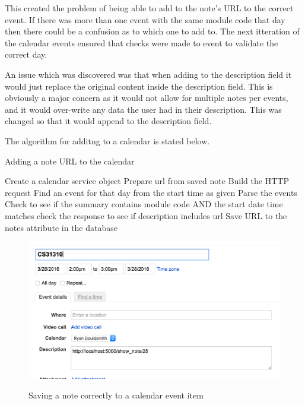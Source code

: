 {{{{{{This created the problem of being able to add to the note's URL to the correct event. If there was more than one event with the same module code that day then there could be a confusion as to which one to add to. The next itteration of the calendar events ensured that checks were made to event to validate the correct day.

An issue which was discovered was that when adding to the description field it would just replace the original content inside the description field. This is obviously a major concern as it would not allow for multiple notes per events, and it would over-write any data the user had in their description. This was changed so that it would append to the description field.

The algorithm for additng to a calendar is stated below.
\begin{algorithm}
  \caption{Adding a note URL to the calendar}
  \label{algorithm:threshold1}
  \begin{algorithmic}[1]
      \State Create a calendar service object
      \State Prepare url from saved note
      \State Build the HTTP request
      \State Find an event for that day from the start time as given
      \State Parse the events
      \State Check to see if the summary contains module code AND the start date time matches
        \State check the response to see if description includes url
        \State Save URL to the notes attribute in the database
      \EndIf
  \end{algorithmic}
\end{algorithm}

\begin{figure}[H]
  \centering
  \includegraphics[scale=0.4]{images/saved_to_calendar}
  \label{fig:saved_to_calendar}
  \caption{Saving a note correctly to a calendar event item}
\end{figure}

}}}}}}
